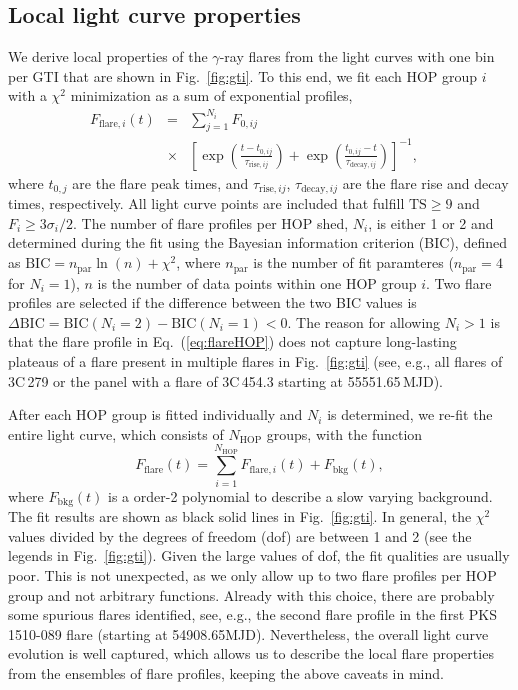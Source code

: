 \documentclass[twocolumn]{aastex62}
\newcommand{\gray}{$\gamma$-ray\xspace}
\begin{document}
\subsection{Local light curve properties}
\label{sec:hop-fit}

We derive local properties of the \gray flares from the light curves with one bin per GTI that are shown in Fig.~\ref{fig:gti}.
To this end, 
we fit each HOP group $i$ with a $\chi^2$ minimization as a sum of exponential profiles, 
\begin{eqnarray}
    F_{\mathrm{flare},i}(t) &=& 
    \sum\limits_{j = 1}^{N_i} F_{0,ij}\nonumber\\
    &\times&\left[\exp\left(\frac{t - t_{0,ij}}{\tau_{\mathrm{rise},ij}}\right) + \exp
    \left(\frac{t_{0,ij} - t}{\tau_{\mathrm{decay},ij}}\right)\right]^{-1}\!\!\!,&
    \label{eq:flareHOP}
\end{eqnarray}
where $t_{0,j}$ are the flare peak times, and $\tau_{\mathrm{rise},ij}$, $\tau_{\mathrm{decay},ij}$ are the flare rise and decay times, respectively.
All light curve points are included that fulfill $\mathrm{TS}\geqslant9$ and $F_i \geqslant 3\sigma_i/2 $.
The number of flare profiles per HOP shed, $N_i$, is either 1 or 2 and determined during the fit using the Bayesian information criterion (BIC), defined as $\mathrm{BIC} = n_\mathrm{par}\ln(n) + \chi^2$, where $n_\mathrm{par}$ is the number of fit paramteres ($n_\mathrm{par} = 4$ for $N_i = 1$), $n$ is the number of data points within one HOP group $i$. Two flare profiles are selected if the difference between the two BIC values is $\Delta\mathrm{BIC} = \mathrm{BIC}(N_i = 2) - \mathrm{BIC}(N_i = 1) < 0$.
The reason for allowing $N_i > 1$ is that the flare profile in Eq.~(\ref{eq:flareHOP}) does not capture long-lasting plateaus of a flare present in multiple flares in Fig.~\ref{fig:gti} (see, e.g., all flares of 3C\,279 or the panel with a flare of 3C\,454.3 starting at 55551.65\,MJD).

After each HOP group is fitted individually and $N_i$ is determined, 
we re-fit the entire light curve, which consists of $N_\mathrm{HOP}$ groups, with the function 
\begin{equation}
    F_\mathrm{flare}(t) = \sum\limits_{i = 1}^{N_\mathrm{HOP}}F_{\mathrm{flare},i}(t) + F_\mathrm{bkg}(t),
\end{equation}
where $F_\mathrm{bkg}(t)$ is a order-2 polynomial to describe a slow  varying background.
The fit results are shown as black solid lines in Fig.~\ref{fig:gti}.
In general, the $\chi^2$ values divided by the degrees of freedom (dof) are between 1 and 2 (see the legends in Fig.~\ref{fig:gti}). Given the large values of dof, the fit qualities are usually poor. This is not unexpected, as we only allow up to two flare profiles per HOP group and not arbitrary functions. Already with this choice, there are probably some spurious flares identified, see, e.g., the second flare profile in the first PKS\,1510-089 flare (starting at 54908.65MJD). 
Nevertheless, the overall light curve evolution is well captured, which allows us to describe the local flare properties from the ensembles of flare profiles, keeping the above caveats in mind. 
\end{document}
